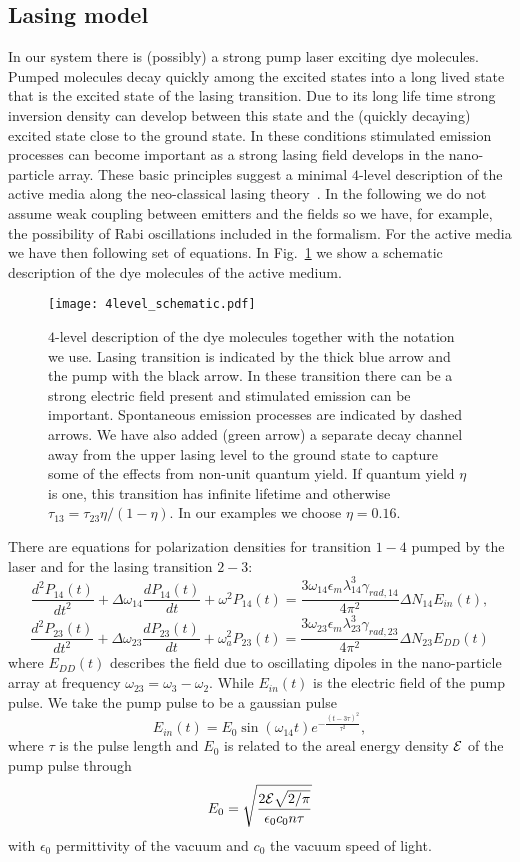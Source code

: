 \documentclass{iopart}
\newcommand{\beq}{\begin{equation}}
\newcommand{\enq}{\end{equation}}
\begin{document}
\subsection{Lasing model}
In our system there is (possibly) a strong pump laser exciting
dye molecules. Pumped molecules decay quickly among the excited states
into a long lived state that is the excited state of the lasing transition.
Due to its long life time strong inversion density can develop
between this state and the (quickly decaying) excited state close to the ground state. In these
conditions stimulated emission processes can become important as a strong lasing field develops in the nano-particle array. These basic principles
suggest a minimal $4$-level description of the active media along the
neo-classical lasing theory~\cite{anthony_e._siegman_lasers_1986}.
In the following we do not assume weak coupling between emitters and the fields
so we have, for example, the possibility of Rabi oscillations
included in the formalism.
For the active media we have then following set of equations. 
In Fig.~\ref{fig:4level_schematic} we show a schematic description
of the dye molecules of the active medium.
\begin{figure} %
\texttt{[image: 4level\_schematic.pdf]}
\caption[Fig3]{$4$-level description of the dye molecules together with the notation
we use. Lasing transition is indicated by the thick blue arrow and the pump with the black arrow. In these transition there can be a strong
electric field present and stimulated emission can be important.
Spontaneous emission processes are indicated by dashed arrows. We have also
added (green arrow) a separate decay channel away from the
upper lasing level to the ground state to capture some of the effects from
non-unit quantum yield. If quantum yield $\eta$ is one, this transition has infinite lifetime and otherwise $\tau_{13}=\tau_{23} \eta/(1-\eta)$. In our 
examples we choose $\eta=0.16$.
}
\label{fig:4level_schematic}
\end{figure} 


There are equations for polarization densities for transition $1-4$ pumped by the laser
and for the lasing transition $2-3$:
\beq
\frac{d^2P_{14}(t)}{dt^2}+\Delta\omega_{14}\frac{dP_{14}(t)}{dt}+\omega^2P_{14}(t)=
\frac{3\omega_{14}\epsilon_m\lambda_{14}^3\gamma_{rad,14}}{4\pi^2}\Delta N_{14} E_{in}(t),
\enq
\beq
\frac{d^2P_{23}(t)}{dt^2}+\Delta\omega_{23}\frac{dP_{23}(t)}{dt}+\omega_a^2P_{23}(t)=
\frac{3\omega_{23}\epsilon_m\lambda_{23}^3\gamma_{rad,23}}{4\pi^2}\Delta N_{23} E_{DD}(t)
\enq
where $E_{DD}(t)$ describes the field due to oscillating dipoles in the nano-particle array at frequency $\omega_{23}=\omega_3-\omega_2$. 
While $E_{in}(t)$ is the electric field of the pump pulse. We take the pump pulse to be a gaussian pulse
\beq
E_{in}(t)=E_0\sin(\omega_{14}t)e^{-\frac{(t-3\tau)^2}{\tau^2}},
\enq
where $\tau$ is the pulse length and $E_0$ is related to the areal energy
density $\cal{E}$ of the pump pulse through
\beq
E_0=\sqrt{\frac{2{\cal E}\sqrt{2/\pi}}{\epsilon_0 c_0 n\tau}}
\enq
with $\epsilon_0$ permittivity of the vacuum and $c_0$ the vacuum speed of light.
\end{document}
